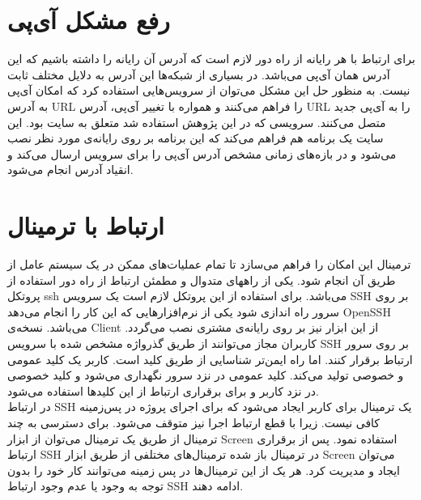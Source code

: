 \section{
	رفع مشکل آی‌پی 
}

برای ارتباط با هر رایانه از راه دور لازم است که آدرس آن رایانه را داشته باشیم که این آدرس همان آی‌پی می‌باشد. در بسیاری از شبکه‌ها این آدرس  به دلایل مختلف ثابت نیست. به منظور حل این مشکل  می‌توان از سرویس‌هایی استفاده کرد که امکان  آی‌پی به آدرس URL را فراهم می‌کنند و همواره با تغییر آی‌پی، آدرس URL را به آی‌پی جدید متصل می‌کنند. سرویسی که در این پژوهش استفاده شد متعلق به سایت
 بود. این سایت یک برنامه هم فراهم می‌کند که این برنامه بر روی رایانه‌ی مورد نظر نصب می‌شود و در بازه‌های زمانی مشخص آدرس آی‌پی را برای سرویس ارسال می‌کند و انقیاد آدرس انجام می‌شود. 
\section{ارتباط با ترمینال}
ترمینال این امکان را فراهم می‌سازد تا تمام عملیات‌های ممکن در یک سیستم عامل از طریق آن انجام شود. یکی از راههای متدوال و مطمئن  ارتباط از راه دور استفاده از پروتکل ssh می‌باشد. برای استفاده از این پروتکل لازم است یک سرویس SSH بر روی سرور راه اندازی شود یکی از نرم‌افزارهایی که این کار را انجام می‌دهد OpenSSH می‌باشد. نسخه‌ی Client از این ابزار نیز بر روی رایانه‌ی مشتری نصب می‌گردد. کاربران مجاز می‌توانند از طریق گذرواژه  مشخص شده با سرویس   SSH بر روی سرور ارتباط برقرار کنند. اما راه ایمن‌تر شناسایی از طریق کلید است. کاربر یک کلید عمومی و خصوصی تولید می‌کند. کلید عمومی در نزد  سرور نگهداری می‌شود و کلید خصوصی در نزد کاربر و برای برقراری ارتباط از این کلید‌ها استفاده می‌شود.\\

در ارتباط SSH یک ترمینال برای کاربر ایجاد می‌شود که برای اجرای پروژه در پس‌زمینه کافی نیست. زیرا با قطع ارتباط اجرا نیز متوقف می‌شود. برای دسترسی به چند ترمینال از طریق یک ترمینال می‌توان از ابزار Screen استفاده نمود. پس از برقراری ارتباط SSH در ترمینال باز شده ترمینال‌های مختلفی از طریق ابزار Screen می‌توان ایجاد و مدیریت کرد. هر یک از این ترمینال‌ها در پس زمینه می‌توانند کار خود را بدون توجه به وجود یا عدم وجود ارتباط SSH ادامه دهند. 
